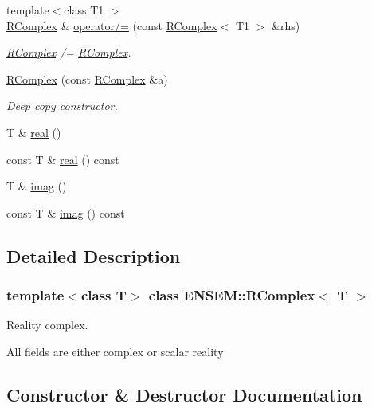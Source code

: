 \begin{DoxyCompactItemize}
{\footnotesize template$<$class T1 $>$ }\\\mbox{\hyperlink{classENSEM_1_1RComplex}{R\+Complex}} \& \mbox{\hyperlink{classENSEM_1_1RComplex_af06d63062569441e7fc7bb532334a109}{operator/=}} (const \mbox{\hyperlink{classENSEM_1_1RComplex}{R\+Complex}}$<$ T1 $>$ \&rhs)
\begin{DoxyCompactList}\small\item\em \mbox{\hyperlink{classENSEM_1_1RComplex}{R\+Complex}} /= \mbox{\hyperlink{classENSEM_1_1RComplex}{R\+Complex}}. \end{DoxyCompactList}\item 
\mbox{\hyperlink{classENSEM_1_1RComplex_acfff70ac44afad9aa6848f117f86b675}{R\+Complex}} (const \mbox{\hyperlink{classENSEM_1_1RComplex}{R\+Complex}} \&a)
\begin{DoxyCompactList}\small\item\em Deep copy constructor. \end{DoxyCompactList}\item 
T \& \mbox{\hyperlink{classENSEM_1_1RComplex_a1675e3defa774edeb1a7390bd14a86c8}{real}} ()
\item 
const T \& \mbox{\hyperlink{classENSEM_1_1RComplex_a0a055b8b16ef4c73ab5fb4e5ff93c7f1}{real}} () const
\item 
T \& \mbox{\hyperlink{classENSEM_1_1RComplex_af4f97cf18c025407a8e66f848252243d}{imag}} ()
\item 
const T \& \mbox{\hyperlink{classENSEM_1_1RComplex_a8df643a2ba06dc851d19eb35cd4c4cde}{imag}} () const
\end{DoxyCompactItemize}


\subsection{Detailed Description}
\subsubsection*{template$<$class T$>$\newline
class E\+N\+S\+E\+M\+::\+R\+Complex$<$ T $>$}

Reality complex. 

All fields are either complex or scalar reality 

\subsection{Constructor \& Destructor Documentation}
\mbox{\label{classENSEM_1_1RComplex_a5c5fc0c5c776dc45229f8702053962e5}} 
